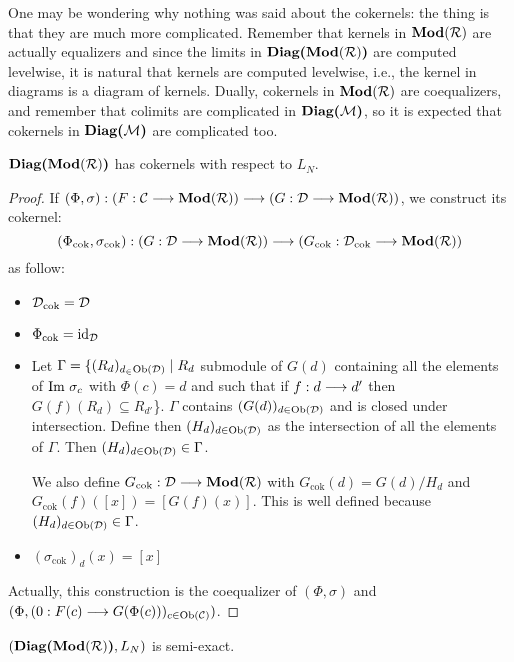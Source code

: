 One may be wondering why nothing was said about the cokernels: the thing is that they are much more complicated. Remember that kernels in $\textbf{Mod}(\mathcal{R})$ are actually equalizers and since the limits in $\textbf{Diag(}\textbf{Mod}(\mathcal{R})\textbf{)}$ are computed levelwise, it is natural that kernels are computed levelwise, i.e., the kernel in diagrams is a diagram of kernels. Dually, cokernels in $\textbf{Mod}(\mathcal{R})$ are coequalizers, and remember that colimits are complicated in $\textbf{Diag(}\mathcal{M}\textbf{)}$, so it is expected that cokernels in $\textbf{Diag(}\mathcal{M}\textbf{)}$ are complicated too.

\begin{lemme} $\textbf{Diag(}\textbf{Mod}(\mathcal{R})\textbf{)}$ has cokernels with respect to $L_N$. \end{lemme}

\begin{proof}
If $(\Phi,\sigma) : (F : \mathcal{C} \longrightarrow \textbf{Mod}(\mathcal{R})) \longrightarrow (G : \mathcal{D} \longrightarrow \textbf{Mod}(\mathcal{R}))$, we construct its cokernel:
	$$(\Phi_{\text{cok}},\sigma_{\text{cok}}) : (G : \mathcal{D} \longrightarrow \textbf{Mod}(\mathcal{R})) \longrightarrow (G_{\text{cok}} : \mathcal{D}_{\text{cok}} \longrightarrow \textbf{Mod}(\mathcal{R}))$$
as follow:
		\begin{itemize}
			\item ${\mathcal{D}}_{\text{cok}} = {\mathcal{D}}$
			\item $\Phi_{\text{cok}} = \text{id}_{\mathcal{D}}$
			\item Let $\Gamma = \{(R_d)_{d_\in \text{Ob}(\mathcal{D})} \mid R_d$ submodule of  $G(d)$ containing all the elements of
$\text{Im }\sigma_c$ with $\Phi(c) = d$ and such that if $f : d \longrightarrow d'$ then $G(f)(R_{d}) \subseteq R_{d'}$\}. $\Gamma$ contains $(G(d))_{d\in\text{Ob}(\mathcal{D})}$ and is closed under intersection. Define then $(H_d)_{d\in\text{Ob}(\mathcal{D})}$ as the intersection of all the elements of $\Gamma$. Then $(H_d)_{d\in\text{Ob}(\mathcal{D})}\in\Gamma$.

			We also define $G_{\text{cok}} : \mathcal{D} \longrightarrow \textbf{Mod}(\mathcal{R})$ with $G_{\text{cok}}(d) = G(d)/H_d$ and $G_{\text{cok}}(f)([x]) = [G(f)(x)]$. This is well defined because $(H_d)_{d\in\text{Ob}(\mathcal{D})}\in\Gamma$.
			\item $(\sigma_{\text{cok}})_d(x) = [x]$
		\end{itemize}
Actually, this construction is the coequalizer of $(\Phi,\sigma)$ and $(\Phi,(0 : F(c) \longrightarrow G(\Phi(c)))_{c\in\text{Ob}(\mathcal{C})})$.
\end{proof}

\begin{prop} $(\textbf{Diag(}\textbf{Mod}(\mathcal{R})\textbf{)},L_N)$ is semi-exact. \end{prop}


